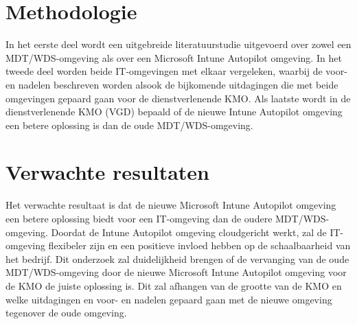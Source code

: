 
\section{Methodologie}
\label{sec:methodologie}

In het eerste deel wordt een uitgebreide literatuurstudie uitgevoerd over zowel een MDT/WDS-omgeving als over een Microsoft Intune Autopilot omgeving. 
\newline
In het tweede deel worden beide IT-omgevingen met elkaar vergeleken, waarbij de voor- en nadelen beschreven worden alsook de bijkomende uitdagingen die met beide omgevingen gepaard gaan voor de dienstverlenende KMO.
\newline
Als laatste wordt in de dienstverlenende KMO (VGD) bepaald of de nieuwe Intune Autopilot omgeving een betere oplossing is dan de oude MDT/WDS-omgeving.


\section{Verwachte resultaten}
\label{sec:verwachte_resultaten}

Het verwachte resultaat is dat de nieuwe Microsoft Intune Autopilot omgeving een betere oplossing biedt voor een IT-omgeving dan de oudere MDT/WDS-omgeving. Doordat de Intune Autopilot omgeving cloudgericht werkt, zal de IT-omgeving flexibeler zijn en een positieve invloed hebben op de schaalbaarheid van het bedrijf. Dit onderzoek zal duidelijkheid brengen of de vervanging van de oude MDT/WDS-omgeving door de nieuwe Microsoft Intune Autopilot omgeving voor de KMO de juiste oplossing is. Dit zal afhangen van de grootte van de KMO en welke uitdagingen en voor- en nadelen gepaard gaan met de nieuwe omgeving tegenover de oude omgeving.


